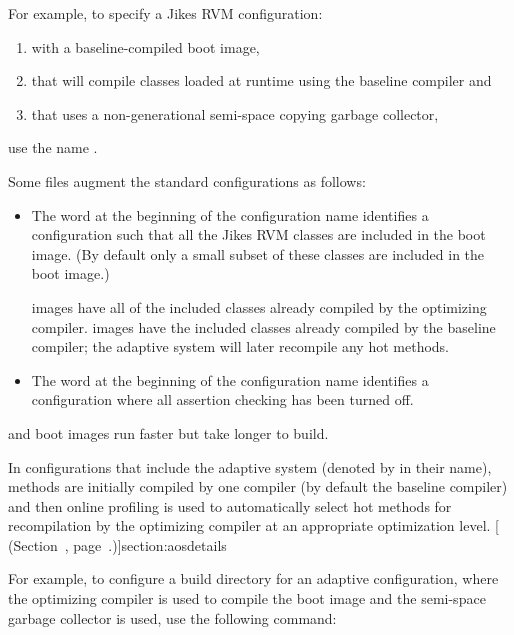 For example, to specify a Jikes RVM configuration: 
\begin{enumerate}
\item with a baseline-compiled boot image,
\item that will compile classes loaded at runtime using the baseline 
compiler and
\item that uses a non-generational semi-space copying garbage
collector, 
\end{enumerate}
use the name .

Some files augment the standard configurations as follows:

\begin{itemize}

\item The word 
 at the beginning of the configuration name identifies a
configuration such that all the Jikes RVM classes are included in the
boot image.  (By default 
only a small subset of these classes are included in the boot image.)

 images 
have all of the included classes already compiled by the optimizing
compiler.   images have the included classes
already compiled by the baseline compiler; the adaptive system will
later recompile any hot methods.

\item The word  at the beginning of 
the configuration name identifies a  configuration where
all assertion checking has been turned off.

\end{itemize}

 and  boot images run faster but take
longer to build.

%
In configurations that include the adaptive system (denoted by
 in their name), methods are initially compiled by one
compiler (by default the baseline compiler) and then online profiling
is used to automatically select hot methods for recompilation by the
optimizing compiler at an appropriate optimization level.  [ (Section~\Ref, page~\Pageref.)]{section:aosdetails}

For example, to configure a build directory for an adaptive
configuration, where the optimizing compiler is used to compile the
boot image and the semi-space garbage collector is used, use the
following command:

